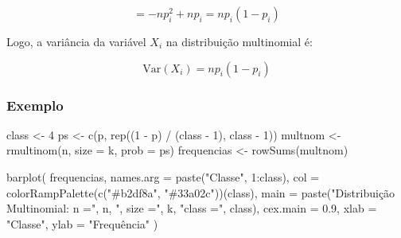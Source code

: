\documentclass[
]{article}
\newenvironment{Shaded}{\begin{snugshade}}{\end{snugshade}}
\newcommand{\AttributeTok}[1]{\textcolor[rgb]{0.77,0.63,0.00}{#1}}
\newcommand{\DecValTok}[1]{\textcolor[rgb]{0.00,0.00,0.81}{#1}}
\newcommand{\FloatTok}[1]{\textcolor[rgb]{0.00,0.00,0.81}{#1}}
\newcommand{\FunctionTok}[1]{\textcolor[rgb]{0.00,0.00,0.00}{#1}}
\newcommand{\NormalTok}[1]{#1}
\newcommand{\OtherTok}[1]{\textcolor[rgb]{0.56,0.35,0.01}{#1}}
\newcommand{\SpecialCharTok}[1]{\textcolor[rgb]{0.00,0.00,0.00}{#1}}
\newcommand{\StringTok}[1]{\textcolor[rgb]{0.31,0.60,0.02}{#1}}
\begin{document}
\[
= -np_i^2 + np_i = np_i(1 - p_i)
\]

Logo, a variância da variável \(X_i\) na distribuição multinomial é:

\[
\text{Var}(X_i) = np_i(1 - p_i)
\]

\hypertarget{exemplo-multinomial}{%
\subsubsection{Exemplo}\label{exemplo-multinomial}}

\begin{Shaded}
\begin{Highlighting}[]
\NormalTok{class }\OtherTok{\textless{}{-}} \DecValTok{4}
\NormalTok{ps }\OtherTok{\textless{}{-}} \FunctionTok{c}\NormalTok{(p, }\FunctionTok{rep}\NormalTok{((}\DecValTok{1} \SpecialCharTok{{-}}\NormalTok{ p) }\SpecialCharTok{/}\NormalTok{ (class }\SpecialCharTok{{-}} \DecValTok{1}\NormalTok{), class }\SpecialCharTok{{-}} \DecValTok{1}\NormalTok{))}
\NormalTok{multnom }\OtherTok{\textless{}{-}} \FunctionTok{rmultinom}\NormalTok{(n, }\AttributeTok{size =}\NormalTok{ k, }\AttributeTok{prob =}\NormalTok{ ps)}
\NormalTok{frequencias }\OtherTok{\textless{}{-}} \FunctionTok{rowSums}\NormalTok{(multnom)}
\end{Highlighting}
\end{Shaded}

\newpage

\begin{Shaded}
\begin{Highlighting}[]
\FunctionTok{barplot}\NormalTok{(}
\NormalTok{  frequencias,}
  \AttributeTok{names.arg =} \FunctionTok{paste}\NormalTok{(}\StringTok{"Classe"}\NormalTok{, }\DecValTok{1}\SpecialCharTok{:}\NormalTok{class),}
  \AttributeTok{col =} \FunctionTok{colorRampPalette}\NormalTok{(}\FunctionTok{c}\NormalTok{(}\StringTok{"\#b2df8a"}\NormalTok{, }\StringTok{"\#33a02c"}\NormalTok{))(class),}
  \AttributeTok{main =} \FunctionTok{paste}\NormalTok{(}\StringTok{"Distribuição Multinomial: n ="}\NormalTok{, n, }\StringTok{", size ="}\NormalTok{, k, }\StringTok{"class ="}\NormalTok{, class),}
  \AttributeTok{cex.main =} \FloatTok{0.9}\NormalTok{,}
  \AttributeTok{xlab =} \StringTok{"Classe"}\NormalTok{,}
  \AttributeTok{ylab =} \StringTok{"Frequência"}
\NormalTok{)}
\end{Highlighting}
\end{Shaded}
\end{document}
